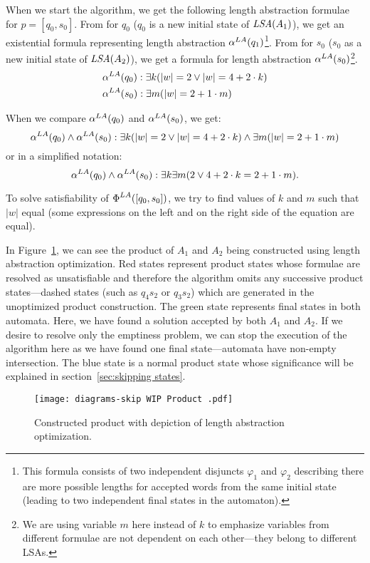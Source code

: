 When we start the algorithm, we get the following length abstraction formulae for $p = [q_0, s_0]$. From  for $q_0$ ($q_0$ is a new initial state of $\emph{LSA}(A_1)$), we get an existential formula representing length abstraction $\alpha^{LA}(q_1)$\footnote{This formula consists of two independent disjuncts $\varphi_1$ and $\varphi_2$ describing there are more possible lengths for accepted words from the same initial state (leading to two independent final states in the automaton).}. From  for $s_0$ ($s_0$ as a new initial state of $\emph{LSA}(A_2)$), we get a formula for length abstraction $\alpha^{LA}(s_0)$\footnote{We are using variable $m$ here instead of $k$ to emphasize variables from different formulae are not dependent on each other---they belong to different LSAs.}.
\begin{align*}
    &\alpha^{LA}(q_0): \exists k ( |w| = 2 \lor |w| = 4 + 2 \cdot k ) \\
    &\alpha^{LA}(s_0): \exists m ( |w| = 2 + 1 \cdot m )
\end{align*}

When we compare $\alpha^{LA}(q_0)$ and $\alpha^{LA}(s_0)$, we get:
\[
    \alpha^{LA}(q_0) \land \alpha^{LA}(s_0) : \exists k ( |w| = 2 \lor |w| = 4 + 2 \cdot k ) \land \exists m ( |w| = 2 + 1 \cdot m )
\]
or in a simplified notation:
$$ \alpha^{LA}(q_0) \land \alpha^{LA}(s_0) : \exists k \exists m ( 2 \lor 4 + 2 \cdot k = 2 + 1 \cdot m ) \text{.} $$

To solve satisfiability of $\emph{$\Phi$}^{LA}([q_0, s_0])$, we try to find values of $k$ and $m$ such that $|w|$ equal (some expressions on the left and on the right side of the equation are equal).

In Figure~\ref{fig:product_WIP}, we can see the product of $A_1$ and $A_2$ being constructed using length abstraction optimization. Red states represent product states whose formulae are resolved as unsatisfiable and therefore the algorithm omits any successive product states---dashed states (such as $q_4s_2$ or $q_3s_2$) which are generated in the unoptimized product construction. The green state represents final states in both automata. Here, we have found a solution accepted by both $A_1$ and $A_2$. If we desire to resolve only the emptiness problem, we can stop the execution of the algorithm here as we have found one final state---automata have non-empty intersection. The blue state is a normal product state whose significance will be explained in section~\ref{sec:skipping states}.

\begin{figure}[ht]
	\centering
	\texttt{[image: diagrams-skip WIP Product .pdf]}
	\caption{Constructed product with depiction of length abstraction optimization.}
	\label{fig:product_WIP}
\end{figure}

